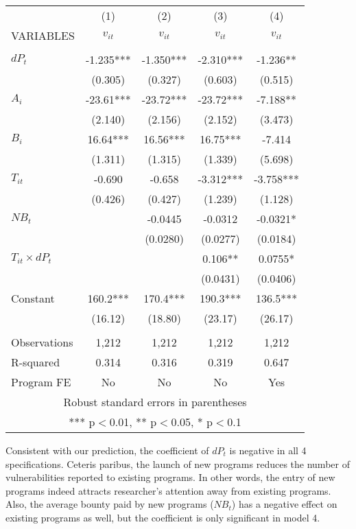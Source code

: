 \begin{table}
	\centering
	\begin{tabular}{lcccc} \hline
		& (1) & (2) & (3) & (4) \\
		VARIABLES & $v_{it}$ & $v_{it}$ & $v_{it}$ & $v_{it}$ \\ \hline
		&  &  &  &  \\
		$dP_t$ & -1.235*** & -1.350*** & -2.310*** & -1.236** \\
		& (0.305) & (0.327) & (0.603) & (0.515) \\
		$A_i$ & -23.61*** & -23.72*** & -23.72*** & -7.188** \\
		& (2.140) & (2.156) & (2.152) & (3.473) \\
		$B_i$ & 16.64*** & 16.56*** & 16.75*** & -7.414 \\
		& (1.311) & (1.315) & (1.339) & (5.698) \\
		$T_{it}$ & -0.690 & -0.658 & -3.312*** & -3.758*** \\
		& (0.426) & (0.427) & (1.239) & (1.128) \\
		$NB_t$ &  & -0.0445 & -0.0312 & -0.0321* \\
		&  & (0.0280) & (0.0277) & (0.0184) \\
		$T_{it} \times dP_t$ &  &  & 0.106** & 0.0755* \\
		&  &  & (0.0431) & (0.0406) \\
		Constant & 160.2*** & 170.4*** & 190.3*** & 136.5*** \\
		& (16.12) & (18.80) & (23.17) & (26.17) \\
		&  &  &  &  \\
		Observations & 1,212 & 1,212 & 1,212 & 1,212 \\
		R-squared & 0.314 & 0.316 & 0.319 & 0.647 \\
		Program FE & No & No & No & Yes \\ \hline
		\multicolumn{5}{c}{ Robust standard errors in parentheses} \\
		\multicolumn{5}{c}{ *** p$<$0.01, ** p$<$0.05, * p$<$0.1} \\
	\end{tabular}
	\label{tab:reg}
\end{table}

Consistent with our prediction, the coefficient of $dP_t$ is negative in all 4 specifications. Ceteris paribus, the launch of new programs reduces the number of vulnerabilities reported to existing programs. In other words, the entry of new programs indeed attracts researcher's attention away from existing programs. Also, the average bounty paid by new programs ($NB_t$) has a negative effect on existing programs as well, but the coefficient is only significant in model 4. 

